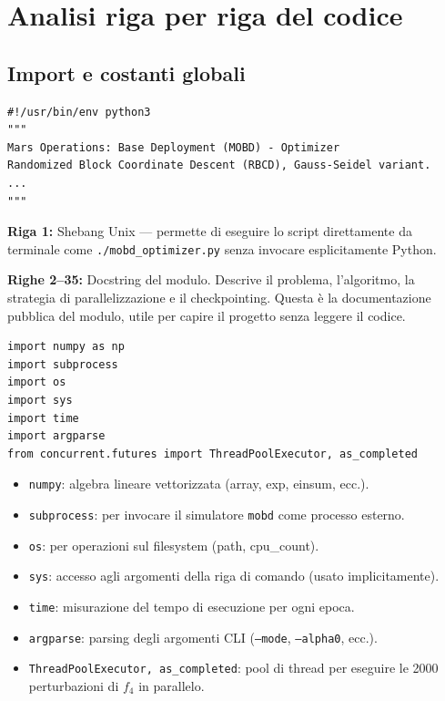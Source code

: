 \documentclass[12pt,a4paper]{article}
\theoremstyle{definition}
\begin{document}
\section{Analisi riga per riga del codice}

\subsection{Import e costanti globali}

\begin{lstlisting}[caption={Righe 1–61 — Header, import e costanti}]
#!/usr/bin/env python3
"""
Mars Operations: Base Deployment (MOBD) - Optimizer
Randomized Block Coordinate Descent (RBCD), Gauss-Seidel variant.
...
"""
\end{lstlisting}

\textbf{Riga 1:} Shebang Unix — permette di eseguire lo script direttamente da terminale
come \texttt{./mobd\_optimizer.py} senza invocare esplicitamente Python.

\textbf{Righe 2–35:} Docstring del modulo. Descrive il problema, l'algoritmo, la strategia
di parallelizzazione e il checkpointing. Questa è la documentazione pubblica del modulo,
utile per capire il progetto senza leggere il codice.

\begin{lstlisting}[caption={Righe 37–43 — Import delle librerie}]
import numpy as np
import subprocess
import os
import sys
import time
import argparse
from concurrent.futures import ThreadPoolExecutor, as_completed
\end{lstlisting}

\begin{itemize}[nosep]
  \item \texttt{numpy}: algebra lineare vettorizzata (array, exp, einsum, ecc.).
  \item \texttt{subprocess}: per invocare il simulatore \texttt{mobd} come processo esterno.
  \item \texttt{os}: per operazioni sul filesystem (path, cpu\_count).
  \item \texttt{sys}: accesso agli argomenti della riga di comando (usato implicitamente).
  \item \texttt{time}: misurazione del tempo di esecuzione per ogni epoca.
  \item \texttt{argparse}: parsing degli argomenti CLI (\texttt{--mode}, \texttt{--alpha0}, ecc.).
  \item \texttt{ThreadPoolExecutor, as\_completed}: pool di thread per eseguire le 2000
        perturbazioni di $f_4$ in parallelo.
\end{itemize}
\end{document}
